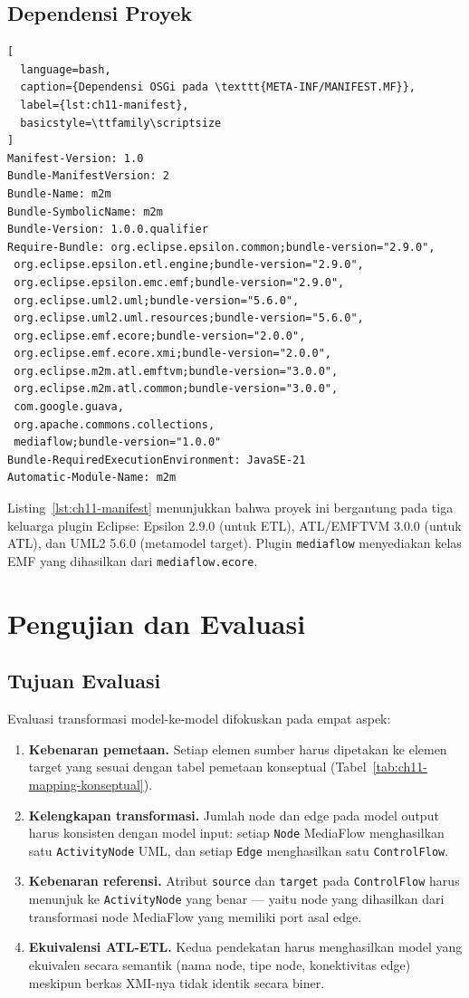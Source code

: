 \subsection{Dependensi Proyek}

\begin{lstlisting}[
  language=bash,
  caption={Dependensi OSGi pada \texttt{META-INF/MANIFEST.MF}},
  label={lst:ch11-manifest},
  basicstyle=\ttfamily\scriptsize
]
Manifest-Version: 1.0
Bundle-ManifestVersion: 2
Bundle-Name: m2m
Bundle-SymbolicName: m2m
Bundle-Version: 1.0.0.qualifier
Require-Bundle: org.eclipse.epsilon.common;bundle-version="2.9.0",
 org.eclipse.epsilon.etl.engine;bundle-version="2.9.0",
 org.eclipse.epsilon.emc.emf;bundle-version="2.9.0",
 org.eclipse.uml2.uml;bundle-version="5.6.0",
 org.eclipse.uml2.uml.resources;bundle-version="5.6.0",
 org.eclipse.emf.ecore;bundle-version="2.0.0",
 org.eclipse.emf.ecore.xmi;bundle-version="2.0.0",
 org.eclipse.m2m.atl.emftvm;bundle-version="3.0.0",
 org.eclipse.m2m.atl.common;bundle-version="3.0.0",
 com.google.guava,
 org.apache.commons.collections,
 mediaflow;bundle-version="1.0.0"
Bundle-RequiredExecutionEnvironment: JavaSE-21
Automatic-Module-Name: m2m
\end{lstlisting}

\noindent Listing~\ref{lst:ch11-manifest} menunjukkan bahwa proyek ini bergantung pada tiga keluarga plugin Eclipse: Epsilon 2.9.0 (untuk ETL), ATL/EMFTVM 3.0.0 (untuk ATL), dan UML2 5.6.0 (metamodel target). Plugin \texttt{mediaflow} menyediakan kelas EMF yang dihasilkan dari \texttt{mediaflow.ecore}.

\section{Pengujian dan Evaluasi}

\subsection{Tujuan Evaluasi}

Evaluasi transformasi model-ke-model difokuskan pada empat aspek:
\begin{enumerate}
  \item \textbf{Kebenaran pemetaan.} Setiap elemen sumber harus dipetakan ke elemen target yang sesuai dengan tabel pemetaan konseptual (Tabel~\ref{tab:ch11-mapping-konseptual}).
  \item \textbf{Kelengkapan transformasi.} Jumlah node dan edge pada model output harus konsisten dengan model input: setiap \texttt{Node} MediaFlow menghasilkan satu \texttt{ActivityNode} UML, dan setiap \texttt{Edge} menghasilkan satu \texttt{ControlFlow}.
  \item \textbf{Kebenaran referensi.} Atribut \texttt{source} dan \texttt{target} pada \texttt{ControlFlow} harus menunjuk ke \texttt{ActivityNode} yang benar --- yaitu node yang dihasilkan dari transformasi node MediaFlow yang memiliki port asal edge.
  \item \textbf{Ekuivalensi ATL-ETL.} Kedua pendekatan harus menghasilkan model yang ekuivalen secara semantik (nama node, tipe node, konektivitas edge) meskipun berkas XMI-nya tidak identik secara biner.
\end{enumerate}

